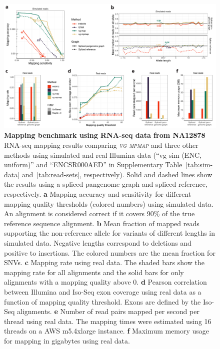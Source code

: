 \documentclass[11pt]{ucthesis}
\newcommand{\tool}[1]{\emph{\textsc{#1}}}
\begin{document}
\begin{figure}[h!]
\ssp
\begin{center}
\includegraphics[width=\textwidth]{mpmapfigures/figure2.pdf}
\caption{\textbf{Mapping benchmark using RNA-seq data from NA12878} \\
RNA-seq mapping results comparing \tool{vg mpmap} and three other methods using simulated and real Illumina data (``vg sim (ENC, uniform)'' and ``ENCSR000AED'' in Supplementary Table~\ref{tab:sim-data} and~\ref{tab:read-sets}, respectively). Solid and dashed lines show the results using a spliced pangenome graph and spliced reference, respectively. \textbf{a} Mapping accuracy and sensitivity for different mapping quality thresholds (colored numbers) using simulated data. An alignment is considered correct if it covers 90\% of the true reference sequence alignment. \textbf{b} Mean fraction of mapped reads supporting the non-reference allele for variants of different lengths in simulated data. Negative lengths correspond to deletions and positive to insertions. The colored numbers are the mean fraction for SNVs. \textbf{c} Mapping rate using real data. The shaded bars show the mapping rate for all alignments and the solid bars for only alignments with a mapping quality above 0. \textbf{d} Pearson correlation between Illumina and Iso-Seq exon coverage using real data as a function of mapping quality threshold. Exons are defined by the Iso-Seq alignments. \textbf{e} Number of read pairs mapped per second per thread using real data. The mapping times were estimated using 16 threads on a AWS m5.4xlarge instance. \textbf{f} Maximum memory usage for mapping in gigabytes using real data.  
} \label{fig:mapping}
\end{center}
\end{figure}
\end{document}
